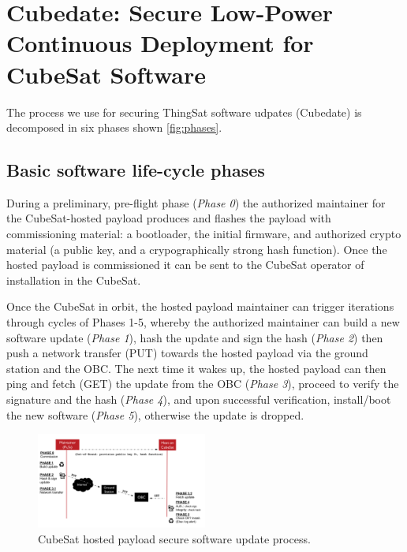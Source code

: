 \section{Cubedate: Secure Low-Power Continuous Deployment for CubeSat Software}
\label{sec:low-power-orbital-communication-arch}

The process we use for securing ThingSat software udpates (Cubedate) is decomposed in six phases shown \autoref{fig:phases}. 

\subsection{Basic software life-cycle phases}

During a preliminary, pre-flight phase (\textit{Phase 0}) the authorized maintainer for the CubeSat-hosted payload
produces and flashes the payload with commissioning material:
a bootloader, the initial firmware, and authorized crypto material (a public key, and a crypographically strong hash function).
Once the hosted payload is commissioned it can be sent to the CubeSat operator of installation in the CubeSat.


Once the CubeSat in orbit, the hosted payload maintainer can trigger iterations through cycles of Phases 1-5, whereby
the authorized maintainer can build a new software update (\textit{Phase 1}), hash the update
and sign the hash (\textit{Phase 2}) then push a network transfer (PUT) towards the hosted payload via the ground station and the OBC. The next time it wakes up, the hosted payload can
then ping and fetch (GET) the update from the OBC (\textit{Phase 3}), proceed to verify the signature and the hash (\textit{Phase 4}),
and upon successful verification, install/boot the new software (\textit{Phase 5}), otherwise the update is dropped.

\begin{figure}[t]
    \centering
    \includegraphics[width=0.5\textwidth]{Figures/CubeSat-Payload-update.png}
    \caption{CubeSat hosted payload secure software update process.}
    \label{fig:phases}
\end{figure}

